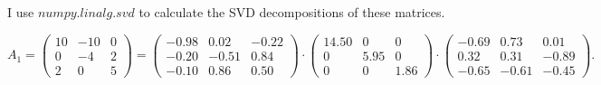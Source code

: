 \documentclass[
  course = {{16-811 Math Fundamentals for Robotics}},
  quartile = {{1}},
  assignment = 1,
  name = {{Kangle Deng}},
  email = {{kangled@andrew.cmu.edu}},
  firstexercise = 1
]{aga-homework}
\begin{document}
\subexercise
I use $numpy.linalg.svd$ to calculate the SVD decompositions of these matrices.

\begin{equation*}
    A_1 = 
    \left(
    \begin{array}{ccc}
        10 & -10 & 0 \\
        0 & -4 & 2 \\
        2 & 0 & 5
    \end{array}
    \right) =
    \left(
    \begin{array}{ccc}
        -0.98 & 0.02 & -0.22 \\
        -0.20 & -0.51 & 0.84 \\
        -0.10 & 0.86 & 0.50
    \end{array}
    \right) \cdot
    \left(
    \begin{array}{ccc}
        14.50 & 0 & 0 \\
        0 & 5.95 & 0 \\
        0 & 0 & 1.86
    \end{array}
    \right) \cdot
    \left(
    \begin{array}{ccc}
        -0.69 & 0.73 & 0.01 \\
        0.32 & 0.31 & -0.89 \\
        -0.65 & -0.61 & -0.45
    \end{array}
    \right).
\end{equation*}
\end{document}
